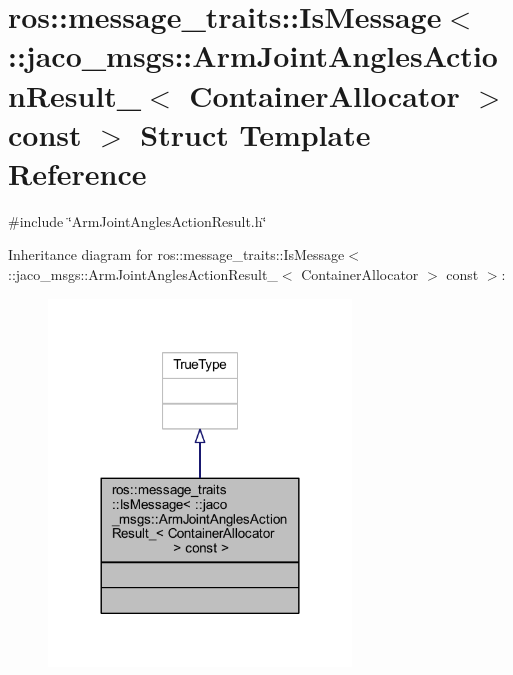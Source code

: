 \hypertarget{structros_1_1message__traits_1_1IsMessage_3_01_1_1jaco__msgs_1_1ArmJointAnglesActionResult___3_0ecc0e89c5dbaf8a28c0c9b85a14163aa}{}\section{ros\+:\+:message\+\_\+traits\+:\+:Is\+Message$<$ \+:\+:jaco\+\_\+msgs\+:\+:Arm\+Joint\+Angles\+Action\+Result\+\_\+$<$ Container\+Allocator $>$ const $>$ Struct Template Reference}
\label{structros_1_1message__traits_1_1IsMessage_3_01_1_1jaco__msgs_1_1ArmJointAnglesActionResult___3_0ecc0e89c5dbaf8a28c0c9b85a14163aa}


{\ttfamily \#include \char`\"{}Arm\+Joint\+Angles\+Action\+Result.\+h\char`\"{}}



Inheritance diagram for ros\+:\+:message\+\_\+traits\+:\+:Is\+Message$<$ \+:\+:jaco\+\_\+msgs\+:\+:Arm\+Joint\+Angles\+Action\+Result\+\_\+$<$ Container\+Allocator $>$ const $>$\+:
\nopagebreak
\begin{figure}[H]
\begin{center}
\leavevmode
\includegraphics[width=228pt]{d6/d6b/structros_1_1message__traits_1_1IsMessage_3_01_1_1jaco__msgs_1_1ArmJointAnglesActionResult___3_0f7dc5ec9b1ffa38ff4bbf6668d86c1bc}
\end{center}
\end{figure}


